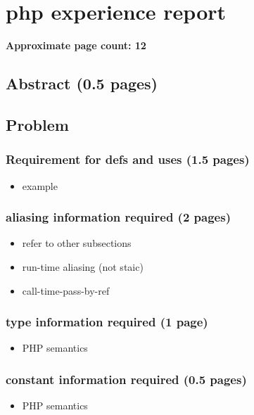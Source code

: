 \chapter*{php experience report}


\textbf{Approximate page count: 12}

\section{Abstract (0.5 pages)}

\section{Problem}

\subsection{Requirement for defs and uses (1.5 pages)}
\begin{itemize}
	\item example
\end{itemize}

\subsection{aliasing information required (2 pages)}
\begin{itemize}
	\item refer to other subsections
	\item run-time aliasing (not staic)
	\item call-time-pass-by-ref
\end{itemize}

\subsection{type information required (1 page)}
\begin{itemize}
	\item PHP semantics
\end{itemize}

\subsection{constant information required (0.5 pages)}
\begin{itemize}
	\item PHP semantics
\end{itemize}

